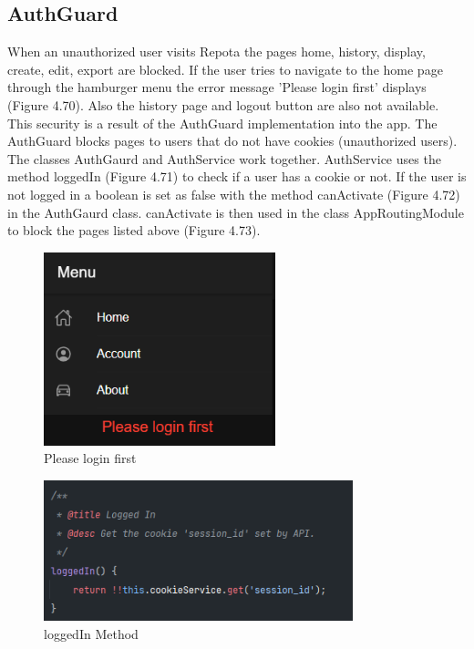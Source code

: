 \subsection{AuthGuard}
When an unauthorized user visits Repota the pages home, history, display, create, edit, export are blocked. If the user tries to navigate to the home page through the hamburger menu the error message 'Please login first' displays (Figure 4.70). Also the history page and logout button are also not available. This security is a result of the AuthGuard implementation into the app. The AuthGuard blocks pages to users that do not have cookies (unauthorized users). The classes AuthGaurd and AuthService work together. AuthService uses the method loggedIn (Figure 4.71) to check if a user has a cookie or not. If the user is not logged in a boolean is set as false with the method canActivate (Figure 4.72) in the AuthGaurd class. canActivate is then used in the class AppRoutingModule to block the pages listed above (Figure 4.73).

\begin{figure}[H]
    \centering
    \caption{Please login first}
    \label{image:pleaseLogin}
    \includegraphics[width=0.6\textwidth]{images/repota/UI/please_login.png}
\end{figure}

\begin{figure}[H]
    \centering
    \caption{loggedIn Method}
    \label{image:loggedIn}
    \includegraphics[width=0.8\textwidth]{images/repota/auth_guard/loggedIn.png}
\end{figure}

